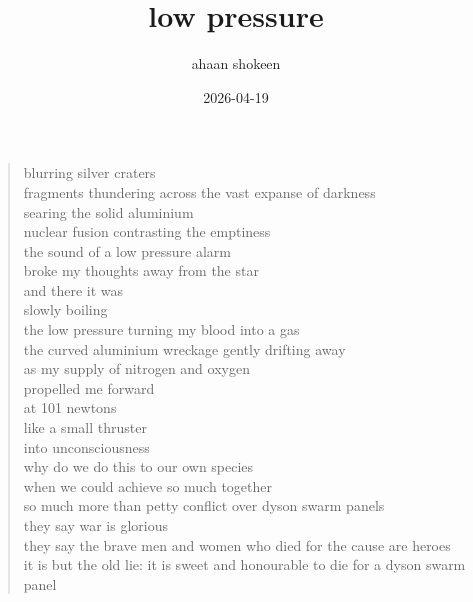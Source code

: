 \documentclass{article}
\title{low pressure}
\author{ahaan shokeen}
\date{2026-04-19}
\begin{document}
  \maketitle

\begin{verse}

  blurring silver craters \\

  fragments thundering across the vast expanse of darkness \\

  searing the solid aluminium \\

  nuclear fusion contrasting the emptiness \\

  the sound of a low pressure alarm \\

  broke my thoughts away from the star \\

  and there it was \\

  slowly boiling \\

  the low pressure turning my blood into a gas \\

  the curved aluminium wreckage gently drifting away \\

  as my supply of nitrogen and oxygen \\

  propelled me forward \\

  at 101 newtons \\

  like a small thruster \\

  into unconsciousness \\

  why do we do this to our own species \\ 
  
  when we could achieve so much together \\

  so much more than petty conflict over dyson swarm panels \\

  they say war is glorious \\

  they say the brave men and women who died for the cause are heroes \\

  it is but the old lie: it is sweet and honourable to die for a dyson swarm panel

\end{verse}
\end{document}
